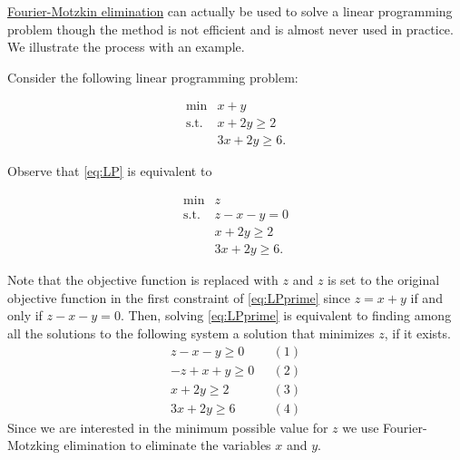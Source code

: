 \documentclass[]{book}
\theoremstyle{definition}
\theoremstyle{definition}
\theoremstyle{remark}
\begin{document}
\protect\hyperlink{fm}{Fourier-Motzkin elimination} can actually be used
to solve a linear programming problem though the method is not efficient
and is almost never used in practice. We illustrate the process with an
example.

Consider the following linear programming problem:

\begin{equation}
\begin{array}{rl}
\min & x + y \\
\text{s.t.}
& x + 2y  \geq 2 \\
& 3x + 2y  \geq 6.
\end{array}\label{eq:LP}
\end{equation}

Observe that \eqref{eq:LP} is equivalent to

\begin{equation}
\begin{array}{rl}
\min & z \\
\text{s.t.}
& z - x - y = 0 \\
& x + 2y  \geq 2 \\
& 3x + 2y  \geq 6.
\end{array}\label{eq:LPprime}
\end{equation}

Note that the objective function is replaced with \(z\) and \(z\) is set
to the original objective function in the first constraint of
\eqref{eq:LPprime} since \(z = x+ y\) if and only if \(z-x-y=0\). Then,
solving \eqref{eq:LPprime} is equivalent to finding among all the
solutions to the following system a solution that minimizes \(z\), if it
exists. \[
\begin{array}{rl}
 z - x - y \geq 0 & ~~~(1) \\
-z + x + y \geq 0 & ~~~(2) \\
 x + 2y  \geq 2 &~~~(3)\\
 3x + 2y  \geq 6 & ~~~(4)
\end{array}
\] Since we are interested in the minimum possible value for \(z\) we
use Fourier-Motzking elimination to eliminate the variables \(x\) and
\(y\).
\end{document}
